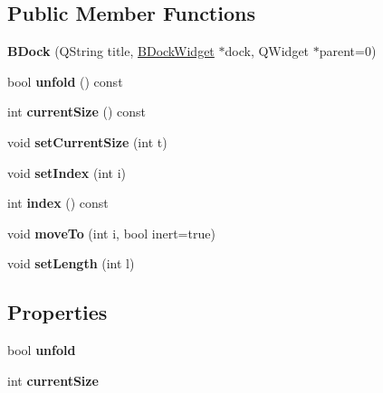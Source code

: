 \subsection*{Public Member Functions}
\begin{DoxyCompactItemize}
\item 
\hypertarget{class_b_dock_a195c91aa591793e1db3bf2d721331b4c}{}\label{class_b_dock_a195c91aa591793e1db3bf2d721331b4c} 
{\bfseries B\+Dock} (Q\+String title, \hyperlink{class_b_dock_widget}{B\+Dock\+Widget} $\ast$dock, Q\+Widget $\ast$parent=0)
\item 
\hypertarget{class_b_dock_a3e2f251abab5b14a830e87c8fdb490ec}{}\label{class_b_dock_a3e2f251abab5b14a830e87c8fdb490ec} 
bool {\bfseries unfold} () const
\item 
\hypertarget{class_b_dock_af122446d10eca0b3eccd2764520d2f8b}{}\label{class_b_dock_af122446d10eca0b3eccd2764520d2f8b} 
int {\bfseries current\+Size} () const
\item 
\hypertarget{class_b_dock_a4c684a21bdc74caac19f5f0e70edc728}{}\label{class_b_dock_a4c684a21bdc74caac19f5f0e70edc728} 
void {\bfseries set\+Current\+Size} (int t)
\item 
\hypertarget{class_b_dock_a3f417a557fece1a4edea4e48528c76e1}{}\label{class_b_dock_a3f417a557fece1a4edea4e48528c76e1} 
void {\bfseries set\+Index} (int i)
\item 
\hypertarget{class_b_dock_a2e9a1493dbe91a5871b7b4df1f6ca786}{}\label{class_b_dock_a2e9a1493dbe91a5871b7b4df1f6ca786} 
int {\bfseries index} () const
\item 
\hypertarget{class_b_dock_a1e7934b069656acb48fb19ac91e1cfac}{}\label{class_b_dock_a1e7934b069656acb48fb19ac91e1cfac} 
void {\bfseries move\+To} (int i, bool inert=true)
\item 
\hypertarget{class_b_dock_ad87572e3aa0252ff1e88dc526d753ce5}{}\label{class_b_dock_ad87572e3aa0252ff1e88dc526d753ce5} 
void {\bfseries set\+Length} (int l)
\end{DoxyCompactItemize}
\subsection*{Properties}
\begin{DoxyCompactItemize}
\item 
\hypertarget{class_b_dock_ad753b995b42a49438012098075c19fec}{}\label{class_b_dock_ad753b995b42a49438012098075c19fec} 
bool {\bfseries unfold}
\item 
\hypertarget{class_b_dock_a2f08c7610017d5c6cb81421666409c9b}{}\label{class_b_dock_a2f08c7610017d5c6cb81421666409c9b} 
int {\bfseries current\+Size}
\end{DoxyCompactItemize}


